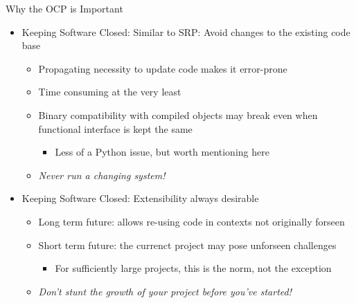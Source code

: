 \begin{frame}{Why the OCP is Important}
%
\begin{itemize}
\item Keeping Software Closed: Similar to SRP: Avoid changes to the existing code base
	\begin{itemize}
	\item Propagating necessity to update code makes it error-prone
	\item Time consuming at the very least
	\item Binary compatibility with compiled objects may break even when functional interface is kept the same
		\begin{itemize}
		\item Less of a Python issue, but worth mentioning here
		\end{itemize}
	\item[\Thus] \emph{Never run a changing system!}
	\end{itemize}
\item Keeping Software Closed: Extensibility always desirable
	\begin{itemize}
	\item Long term future: allows re-using code in contexts not originally forseen
	\item Short term future: the currenct project may pose unforseen challenges
		\begin{itemize}
		\item For sufficiently large projects, this is the norm, not the exception
		\end{itemize}
	\item[\Thus] \emph{Don't stunt the growth of your project before you've started!}
	\end{itemize}
\end{itemize}
%
\end{frame}


